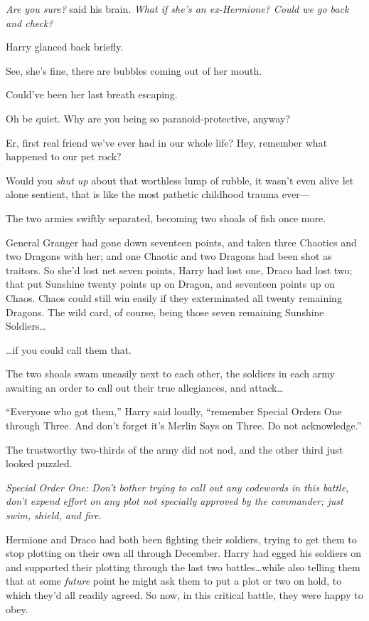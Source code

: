 \emph{Are you sure?} said his brain. \emph{What if she’s an ex-Hermione? Could we go back and check?}

Harry glanced back briefly.

\begin{em}
See, she’s fine, there are bubbles coming out of her mouth.

Could’ve been her last breath escaping.

Oh be quiet. Why are you being so paranoid-protective, anyway?

Er, first real friend we’ve ever had in our whole life? Hey, remember what happened to our pet rock?

Would you \emph{shut up} about that worthless lump of rubble, it wasn’t even alive let alone sentient, that is like the most pathetic childhood trauma ever—
\end{em}

The two armies swiftly separated, becoming two shoals of fish once more.

General Granger had gone down seventeen points, and taken three Chaotics and two Dragons with her; and one Chaotic and two Dragons had been shot as traitors. So she’d lost net seven points, Harry had lost one, Draco had lost two; that put Sunshine twenty points up on Dragon, and seventeen points up on Chaos. Chaos could still win easily if they exterminated all twenty remaining Dragons. The wild card, of course, being those seven remaining Sunshine Soldiers…

…if you could call them that.

The two shoals swam uneasily next to each other, the soldiers in each army awaiting an order to call out their true allegiances, and attack…

“Everyone who got them,” Harry said loudly, “remember Special Orders One through Three. And don’t forget it’s Merlin Says on Three. Do not acknowledge.”

The trustworthy two-thirds of the army did not nod, and the other third just looked puzzled.

\emph{Special Order One: Don’t bother trying to call out any codewords in this battle, don’t expend effort on any plot not specially approved by the commander; just swim, shield, and fire.}

Hermione and Draco had both been fighting their soldiers, trying to get them to stop plotting on their own all through December. Harry had egged his soldiers on and supported their plotting through the last two battles…while also telling them that at some \emph{future} point he might ask them to put a plot or two on hold, to which they’d all readily agreed. So now, in this critical battle, they were happy to obey.


